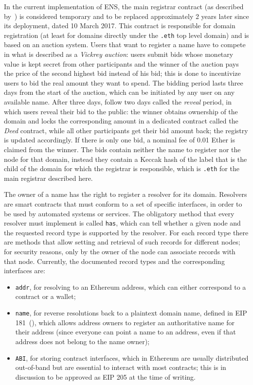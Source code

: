 \documentclass[mscthesis]{usiinfthesis}
\begin{document}
In the current implementation of ENS, the main registrar contract (as described by~\cite{eip:ensregistrar}) is considered temporary and to be replaced approximately 2 years later since its deployment, dated 10 March 2017. This contract is responsible for domain registration (at least for domains directly under the \texttt{.eth} top level domain) and is based on an auction system. Users that want to register a name have to compete in what is described as a \emph{Vickrey auction}: users submit bids whose monetary value is kept secret from other participants and the winner of the auction pays the price of the second highest bid instead of his bid; this is done to incentivize users to bid the real amount they want to spend. The bidding period lasts three days from the start of the auction, which can be initiated by any user on any available name. After three days, follow two days called the \emph{reveal} period, in which users reveal their bid to the public: the winner obtains ownership of the domain and locks the corresponding amount in a dedicated contract called the \emph{Deed} contract, while all other participants get their bid amount back; the registry is updated accordingly. If there is only one bid, a nominal fee of 0.01 Ether is claimed from the winner. The bids contain neither the name to register nor the node for that domain, instead they contain a Keccak hash of the label that is the child of the domain for which the registrar is responsible, which is \texttt{.eth} for the main registrar described here.

The owner of a name has the right to register a resolver for its domain. Resolvers are smart contracts that must conform to a set of specific interfaces, in order to be used by automated systems or services. The obligatory method that every resolver must implement is called \texttt{has}, which can tell whether a given node and the requested record type is supported by the resolver. For each record type there are methods that allow setting and retrieval of such records for different nodes; for security reasons, only by the owner of the node can associate records with that node. Currently, the documented record types and the corresponding interfaces are:
\begin{itemize}
	\item \texttt{addr}, for resolving to an Ethereum address, which can either correspond to a contract or a wallet;
	\item \texttt{name}, for reverse resolutions back to a plaintext domain name, defined in EIP 181~(\cite{eip:181}), which allows address owners to register an authoritative name for their address (since everyone can point a name to an address, even if that address does not belong to the name owner); %
	\item \texttt{ABI}, for storing contract interfaces, which in Ethereum are usually distributed out-of-band but are essential to interact with most contracts; this is in discussion to be approved as EIP 205 at the time of writing.
\end{itemize}
\end{document}
